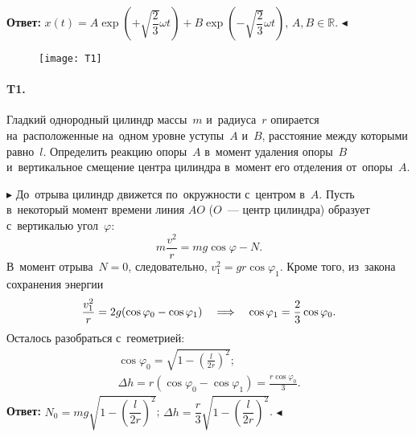 \documentclass{weekly}
\begin{document}
\textbf{Ответ:}\qquad
$x(t) = A \exp\left(+\sqrt{\dfrac23} \omega t\right)
+ B \exp\left(-\sqrt{\dfrac23} \omega t\right)$, \quad
$A, B \in \mathbb{R}$.
\hfill $\blacktriangleleft$


\begin{wrapfigure}[5]{r}{.15\textwidth}
\texttt{[image: T1]}
\end{wrapfigure}
\paragraph{T1.} Гладкий однородный цилиндр массы~$m$ и~радиуса~$r$
опирается на~расположенные на~одном уровне уступы~$A$ и~$B$,
расстояние между которыми равно~$l$. Определить реакцию опоры~$A$
в~момент удаления опоры~$B$ и~вертикальное смещение центра цилиндра
в~момент его отделения от~опоры~$A$.

$\blacktriangleright$ До~отрыва цилиндр движется по~окружности
с~центром в~$A$. Пусть в~некоторый момент времени линия
$AO$ ($O$~--- центр цилиндра) образует с~вертикалью угол~$\varphi$:
\begin{equation}
    m\frac{v^2}{r} = mg\cos\varphi - N.
\end{equation}
В~момент отрыва~$N = 0$, следовательно, $v_1^2 = gr\cos\varphi_1$.
Кроме того, из~закона сохранения энергии
\begin{equation}
    \frac{v_1^2}{r} = 2g(\cos\varphi_0 - \cos\varphi_1)
        \quad \Longrightarrow \quad \cos\varphi_1 = \frac23 \cos\varphi_0.
\end{equation}
Осталось разобраться с~геометрией:
\begin{gather}
    \cos\varphi_0 = \sqrt{1 - \left(\frac{l}{2r}\right)^2}; \\
    \Delta h = r(\cos\varphi_0 - \cos\varphi_1)
        = \frac{r \cos\varphi_0}{3}.
\end{gather}
\textbf{Ответ:}\qquad
$N_0 = mg \sqrt{1 - \left(\dfrac{l}{2r}\right)^2}$; \quad
$\Delta h = \dfrac{r}{3} \sqrt{1 - \left(\dfrac{l}{2r}\right)^2}$.
\hfill $\blacktriangleleft$
\end{document}
